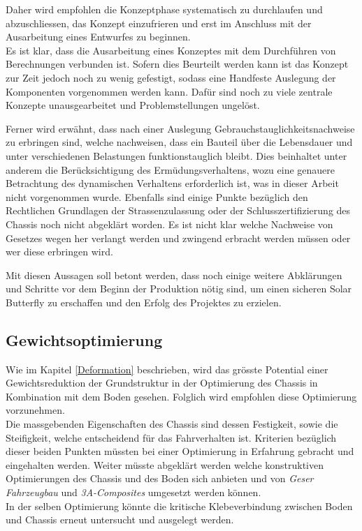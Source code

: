 Daher wird empfohlen die Konzeptphase systematisch zu durchlaufen und abzuschliessen, das Konzept einzufrieren und erst im Anschluss mit der Ausarbeitung eines Entwurfes zu beginnen.\\
Es ist klar, dass die Ausarbeitung eines Konzeptes mit dem Durchführen von Berechnungen verbunden ist. Sofern dies Beurteilt werden kann ist das Konzept zur Zeit jedoch noch zu wenig gefestigt, sodass eine Handfeste Auslegung der Komponenten vorgenommen werden kann. Dafür sind noch zu viele zentrale Konzepte unausgearbeitet und Problemstellungen ungelöst.

Ferner wird erwähnt, dass nach einer Auslegung Gebrauchstauglichkeitsnachweise zu erbringen sind, welche nachweisen, dass ein Bauteil über die Lebensdauer und unter verschiedenen Belastungen funktionstauglich bleibt. Dies beinhaltet unter anderem die Berücksichtigung des Ermüdungsverhaltens, wozu eine genauere Betrachtung des dynamischen Verhaltens erforderlich ist, was in dieser Arbeit nicht vorgenommen wurde.
Ebenfalls sind einige Punkte bezüglich den Rechtlichen Grundlagen der Strassenzulassung oder der Schlusszertifizierung des Chassis noch nicht abgeklärt worden. Es ist nicht klar welche Nachweise von Gesetzes wegen her verlangt werden und zwingend erbracht werden müssen oder wer diese erbringen wird.

Mit diesen Aussagen soll betont werden, dass noch einige weitere Abklärungen und Schritte vor dem Beginn der Produktion nötig sind, um einen sicheren Solar Butterfly zu erschaffen und den Erfolg des Projektes zu erzielen.

\subsection{Gewichtsoptimierung}
Wie im Kapitel \ref{Deformation} beschrieben, wird das grösste Potential einer Gewichtsreduktion der Grundstruktur in der Optimierung des Chassis in Kombination mit dem Boden gesehen. Folglich wird empfohlen diese Optimierung vorzunehmen.\\
Die massgebenden Eigenschaften des Chassis sind dessen Festigkeit, sowie die Steifigkeit, welche entscheidend für das Fahrverhalten ist. Kriterien bezüglich dieser beiden Punkten müssten bei einer Optimierung in Erfahrung gebracht und eingehalten werden. Weiter müsste abgeklärt werden welche konstruktiven Optimierungen des Chassis und des Boden sich anbieten und von \emph{Geser Fahrzeugbau} und \emph{3A-Composites} umgesetzt werden können.\\
In der selben Optimierung könnte die kritische Klebeverbindung zwischen Boden und Chassis erneut untersucht und ausgelegt werden.

